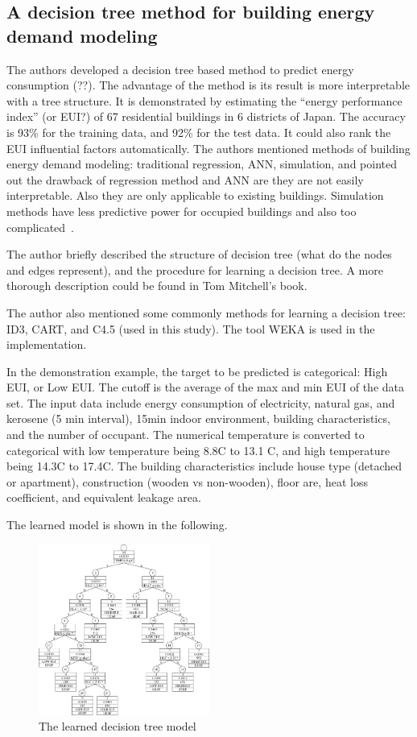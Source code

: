 \documentclass[12pt]{article}
\begin{document}
\subsection{A decision tree method for building energy demand
  modeling~\cite{Yu20101637}}
The authors developed a decision tree based method to predict energy
consumption (??). The advantage of the method is its result is more
interpretable with a tree structure. It is demonstrated by estimating
the ``energy performance index'' (or EUI?) of 67 residential buildings
in 6 districts of Japan. The accuracy is 93\% for the training data,
and 92\% for the test data. It could also rank the EUI influential
factors automatically.  The authors mentioned methods of building
energy demand modeling: traditional regression, ANN, simulation, and
pointed out the drawback of regression method and ANN are they are not
easily interpretable. Also they are only applicable to existing
buildings. Simulation methods have less predictive power for occupied
buildings and also too complicated~\cite{Yu20101637}.

The author briefly described the structure of decision tree (what do
the nodes and edges represent), and the procedure for learning a
decision tree. A more thorough description could be found in Tom
Mitchell's book.

The author also mentioned some commonly methods for learning a
decision tree: ID3, CART, and C4.5 (used in this study). The tool WEKA
is used in the implementation.

In the demonstration example, the target to be predicted is
categorical: High EUI, or Low EUI. The cutoff is the average of the
max and min EUI of the data set. The input data include energy
consumption of electricity, natural gas, and kerosene (5 min
interval), 15min indoor environment, building characteristics, and the
number of occupant. The numerical temperature is converted to
categorical with low temperature being 8.8C to 13.1 C, and high
temperature being 14.3C to 17.4C. The building characteristics include
house type (detached or apartment), construction (wooden vs
non-wooden), floor are, heat loss coefficient, and equivalent leakage
area.

The learned model is shown in the following.
\begin{figure}[h!]
  \centering
  \includegraphics[width=0.5\textwidth]{images/decisionTreeLeared.jpg}
  \caption{The learned decision tree model~\cite{Yu20101637}}
  \label{fig:decisionTreeLeared}
\end{figure}
\FloatBarrier 
\end{document}
